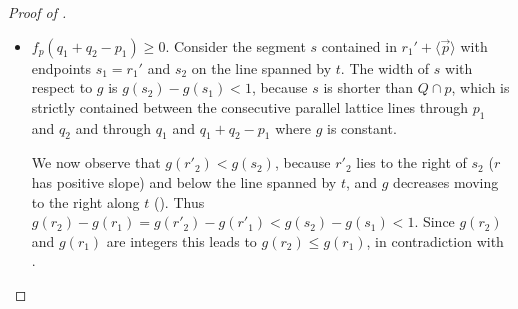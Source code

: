 \documentclass{amsart}
\theoremstyle{plain}
\theoremstyle{definition}
\renewcommand{\vec}[1]{\overrightarrow#1}
\newcommand{\vecline}[1]{\langle \vec #1 \rangle}
\begin{document}
\begin{proof}[Proof of ]
\begin{itemize}
\item \underline{$f_p(q_1+q_2-p_1)\ge 0$}.
Consider the segment $s$ contained in $r_1' + \vecline p$ with endpoints $s_1=r_1'$ and $s_2$ on the line spanned by $t$. The width of $s$ with respect to $g$ is $g(s_2)-g(s_1) <1$, because $s$ is shorter than $Q \cap p$, which is strictly contained between the consecutive parallel lattice lines through $p_1$ and $q_2$ and through $q_1$ and $q_1+q_2-p_1$ where $g$ is constant.

We now observe that $g(r'_2) < g(s_2)$, because $r'_2$ lies to the right of $s_2$ ($r$ has positive slope) and below the line spanned by $t$, and $g$ decreases moving to the right along $t$ (). Thus $g(r_2)-g(r_1) = g(r'_2)-g(r'_1) < g(s_2)-g(s_1) <1$. Since $g(r_2)$ and $g(r_1)$ are integers this leads to $g(r_2)\le g(r_1)$, in contradiction with .
\end{itemize}
\end{proof}
\end{document}
